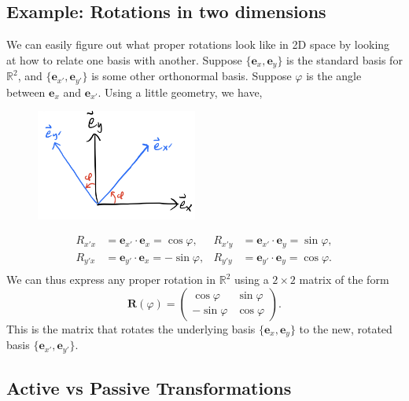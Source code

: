\documentclass[
  letterpaper,
  DIV=11,
  numbers=noendperiod]{scrreprt}
\begin{document}
\hypertarget{example-rotations-in-two-dimensions}{%
\subsection{Example: Rotations in two
dimensions}\label{example-rotations-in-two-dimensions}}

We can easily figure out what proper rotations look like in 2D space by
looking at how to relate one basis with another. Suppose
\(\{\mathbf{e}_x, \mathbf{e}_y \}\) is the standard basis for
\(\mathbb{R}^2\), and \(\{\mathbf{e}_{x'}, \mathbf{e}_{y'}\}\) is some
other orthonormal basis. Suppose \(\varphi\) is the angle between
\(\mathbf{e}_x\) and \(\mathbf{e}_{x'}\). Using a little geometry, we
have,

\begin{figure}

{\centering \includegraphics[width=2.08333in,height=\textheight]{classical-mechanics/./resources/image-20230216110516749.png}

}

\end{figure}

\[
\begin{align*}
R_{x'x} &= \mathbf{e}_{x'} \cdot \mathbf{e}_x = \cos\varphi,
&R_{x'y} &= \mathbf{e}_{x'} \cdot \mathbf{e}_y = \sin\varphi, \\
R_{y'x} &= \mathbf{e}_{y'} \cdot \mathbf{e}_x = -\sin\varphi,
&R_{y'y} &= \mathbf{e}_{y'} \cdot \mathbf{e}_y = \cos\varphi. \\
\end{align*}
\] We can thus express any proper rotation in \(\mathbb{R}^2\) using a
\(2 \times 2\) matrix of the form \[
\mathbf{R}(\varphi) = 
\begin{pmatrix}
\cos\varphi & \sin\varphi \\
-\sin\varphi & \cos\varphi
\end{pmatrix}.
\] This is the matrix that rotates the underlying basis
\(\{\mathbf{e}_x, \mathbf{e}_y \}\) to the new, rotated basis
\(\{\mathbf{e}_{x'}, \mathbf{e}_{y'} \}\).

\hypertarget{active-vs-passive-transformations}{%
\subsection{Active vs Passive
Transformations}\label{active-vs-passive-transformations}}
\end{document}
